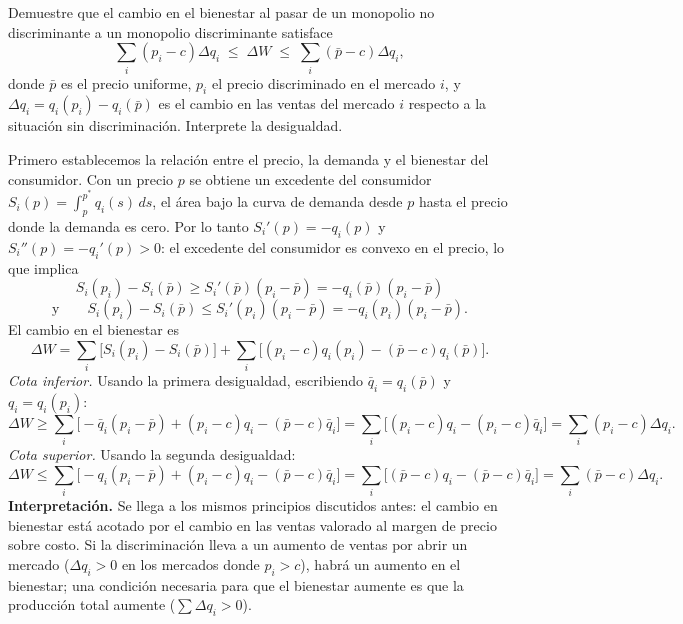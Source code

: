 \question Demuestre que el cambio en el bienestar al pasar de un monopolio no discriminante a un monopolio discriminante satisface
\[
  \sum_{i}(p_i - c)\Delta q_i \;\leq\; \Delta W \;\leq\; \sum_{i}(\bar p - c)\Delta q_i ,
\]
donde $\bar p$ es el precio uniforme, $p_i$ el precio discriminado en el mercado $i$, y $\Delta q_i = q_i(p_i) - q_i(\bar p)$ es el cambio en las ventas del mercado $i$ respecto a la situación sin discriminación. Interprete la desigualdad.
\begin{solution}
Primero establecemos la relación entre el precio, la demanda y el bienestar del consumidor. Con un precio $p$ se obtiene un excedente del consumidor $S_i(p) = \int_p^{p^*}q_i(s)\,ds$, el área bajo la curva de demanda desde $p$ hasta el precio donde la demanda es cero. Por lo tanto $S_i'(p) = -q_i(p)$ y $S_i''(p) = -q_i'(p) > 0$: el excedente del consumidor es convexo en el precio, lo que implica
\[
  S_i(p_i) - S_i(\bar p) \geq S_i'(\bar p)(p_i - \bar p) = -q_i(\bar p)(p_i - \bar p)
\]
\[
  \text{y} \qquad S_i(p_i) - S_i(\bar p) \leq S_i'(p_i)(p_i - \bar p) = -q_i(p_i)(p_i - \bar p).
\]
El cambio en el bienestar es
\[
  \Delta W = \sum_i\bigl[S_i(p_i) - S_i(\bar p)\bigr] + \sum_i\bigl[(p_i - c)q_i(p_i) - (\bar p - c)q_i(\bar p)\bigr].
\]
\emph{Cota inferior.} Usando la primera desigualdad, escribiendo $\bar q_i = q_i(\bar p)$ y $q_i = q_i(p_i)$:
\[
  \Delta W \geq \sum_i\bigl[-\bar q_i(p_i - \bar p) + (p_i - c)q_i - (\bar p - c)\bar q_i\bigr] = \sum_i\bigl[(p_i - c)q_i - (p_i - c)\bar q_i\bigr] = \sum_i(p_i - c)\Delta q_i .
\]
\emph{Cota superior.} Usando la segunda desigualdad:
\[
  \Delta W \leq \sum_i\bigl[-q_i(p_i - \bar p) + (p_i - c)q_i - (\bar p - c)\bar q_i\bigr] = \sum_i\bigl[(\bar p - c)q_i - (\bar p - c)\bar q_i\bigr] = \sum_i(\bar p - c)\Delta q_i .
\]
\textbf{Interpretación.} Se llega a los mismos principios discutidos antes: el cambio en bienestar está acotado por el cambio en las ventas valorado al margen de precio sobre costo. Si la discriminación lleva a un aumento de ventas por abrir un mercado ($\Delta q_i > 0$ en los mercados donde $p_i > c$), habrá un aumento en el bienestar; una condición necesaria para que el bienestar aumente es que la producción total aumente ($\sum\Delta q_i > 0$).

\end{solution}

